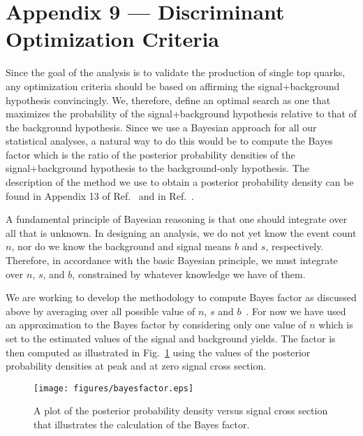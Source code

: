 %

\appendix
\section*{Appendix 9 --- Discriminant Optimization Criteria}
\label{appendix-optimization}

Since the goal of the analysis is to validate the production of single
top quarks, any optimization criteria should be based on affirming the
signal+background hypothesis convincingly. We, therefore, define an
optimal search as one that maximizes the probability of the
signal+background hypothesis relative to that of the background
hypothesis. Since we use a Bayesian approach for all our statistical
analyses, a natural way to do this would be to compute the Bayes
factor which is the ratio of the posterior probability densities of
the signal+background hypothesis to the background-only
hypothesis. The description of the method we use to obtain a posterior
probability density can be found in Appendix 13 of
Ref.~\cite{run2-d0-230} and in Ref.~\cite{d0note5123}.

A fundamental principle of Bayesian reasoning is that one should
integrate over all that is unknown.  In designing an analysis, we do
not yet know the event count $n$, nor do we know the background and
signal means $b$ and $s$, respectively. Therefore, in accordance with
the basic Bayesian principle, we must integrate over $n$, $s$, and $b$,
constrained by whatever knowledge we have of them.

We are working to develop the methodology to compute Bayes factor as
discussed above by averaging over all possible value of $n$, $s$ and
$b$~\cite{d0note5260}. For now we have used an approximation to the
Bayes factor by considering only one value of $n$ which is set to the
estimated values of the signal and background yields. The factor is
then computed as illustrated in Fig.~\ref{fig:bayesfactor} using the
values of the posterior probability densities at peak and at zero
signal cross section.

\begin{figure}[!h!tbp]
\texttt{[image: figures/bayesfactor.eps]}
\vspace{-0.1in}
\begin{minipage}{4in}
\caption[bayesfactor]{A plot of the posterior probability density
versus signal cross section that illustrates the calculation of the
Bayes factor.}
\label{fig:bayesfactor}
\end{minipage}
\end{figure}

